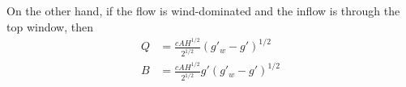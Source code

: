 On the other hand, if the flow is wind-dominated and the inflow is through the
top window, then 
\begin{align}
    Q &= \frac{cAH^{1/2}}{2^{1/2}} (g'_w - g')^{1/2} \\
    B &= \frac{cAH^{1/2}}{2^{1/2}} g' (g'_w - g')^{1/2}
\end{align}
